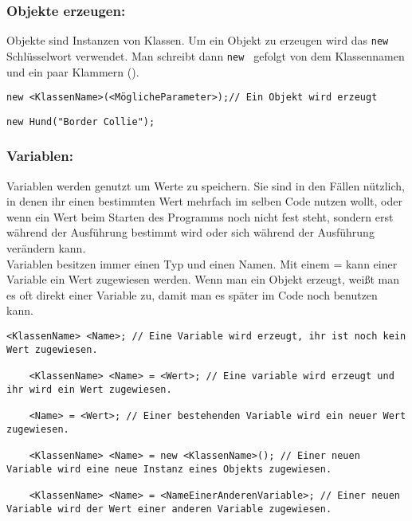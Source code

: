 \begin{Infobox}
	
	\subsubsection*{Objekte erzeugen:}
	Objekte sind Instanzen von Klassen.
	Um ein Objekt zu erzeugen wird das \lstinline{new} Schlüsselwort verwendet.
	Man schreibt dann \lstinline{new } gefolgt von dem Klassennamen und ein paar Klammern ().
\end{Infobox}
\begin{lstlisting}[title=\textbf{Objekt erstellen Syntax}]
	new <KlassenName>(<MöglicheParameter>);// Ein Objekt wird erzeugt
\end{lstlisting}

\begin{lstlisting}[title=\textbf{Objekt erstellen Beispiel}]
	new Hund("Border Collie");
\end{lstlisting}
\begin{Infobox}
	\subsubsection*{Variablen:}
	Variablen werden genutzt um Werte zu speichern.
	Sie sind in den Fällen nützlich, in denen ihr einen bestimmten Wert mehrfach im selben Code nutzen wollt, oder wenn ein Wert beim Starten des Programms noch nicht fest steht, sondern erst während der Ausführung bestimmt wird oder sich während der Ausführung verändern kann.\\
	Variablen besitzen immer einen Typ und einen Namen.
	Mit einem = kann einer Variable ein Wert zugewiesen werden.
	Wenn man ein Objekt erzeugt, weißt man es oft direkt einer Variable zu, damit man es später im Code noch benutzen kann.
\end{Infobox}
\begin{lstlisting}[title=\textbf{Variablen Syntax}]
	<KlassenName> <Name>; // Eine Variable wird erzeugt, ihr ist noch kein Wert zugewiesen.
	
	<KlassenName> <Name> = <Wert>; // Eine variable wird erzeugt und ihr wird ein Wert zugewiesen.
	
	<Name> = <Wert>; // Einer bestehenden Variable wird ein neuer Wert zugewiesen.
	
	<KlassenName> <Name> = new <KlassenName>(); // Einer neuen Variable wird eine neue Instanz eines Objekts zugewiesen.
	
	<KlassenName> <Name> = <NameEinerAnderenVariable>; // Einer neuen Variable wird der Wert einer anderen Variable zugewiesen. 
\end{lstlisting}
